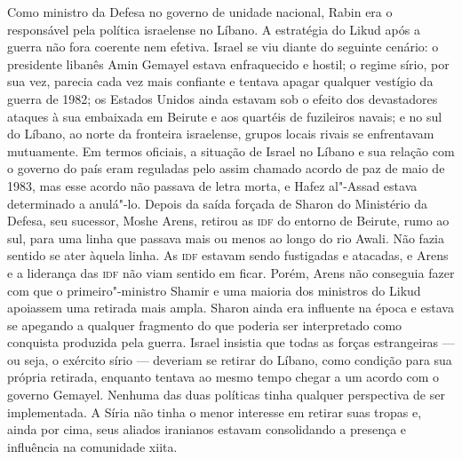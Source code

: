 Como ministro da Defesa no governo de unidade nacional, Rabin era o
responsável pela política israelense no Líbano. A estratégia do Likud
após a guerra não fora coerente nem efetiva. Israel se viu diante
do seguinte cenário: o presidente libanês Amin Gemayel estava
enfraquecido e hostil; o regime sírio, por sua vez, parecia cada vez
mais confiante e tentava apagar qualquer vestígio da guerra de 1982; os
Estados Unidos ainda estavam sob o efeito dos devastadores ataques à sua
embaixada em Beirute e aos quartéis de fuzileiros navais; e no sul do
Líbano, ao norte da fronteira israelense, grupos locais rivais se
enfrentavam mutuamente. Em termos oficiais, a situação de Israel no
Líbano e sua relação com o governo do país eram reguladas pelo assim
chamado acordo de paz de maio de 1983, mas esse acordo não passava de
letra morta, e Hafez al"-Assad estava determinado a anulá"-lo. Depois da
saída forçada de Sharon do Ministério da Defesa, seu sucessor, Moshe
Arens, retirou as \textsc{idf} do entorno de Beirute, rumo ao sul, para uma linha
que passava mais ou menos ao longo do rio Awali. Não fazia sentido se
ater àquela linha. As \textsc{idf} estavam sendo fustigadas e atacadas, e Arens e
a liderança das \textsc{idf} não viam sentido em ficar. Porém, Arens não
conseguia fazer com que o primeiro"-ministro Shamir e uma maioria dos
ministros do Likud apoiassem uma retirada mais ampla. Sharon ainda era
influente na época e estava se apegando a qualquer fragmento do que
poderia ser interpretado como conquista produzida pela guerra. Israel
insistia que todas as forças estrangeiras --- ou seja, o exército sírio
--- deveriam se retirar do Líbano, como condição para sua própria
retirada, enquanto tentava ao mesmo tempo chegar a um acordo com o
governo Gemayel. Nenhuma das duas políticas tinha qualquer perspectiva
de ser implementada. A Síria não tinha o menor interesse em retirar suas
tropas e, ainda por cima, seus aliados iranianos estavam consolidando a
presença e influência na comunidade xiita.

